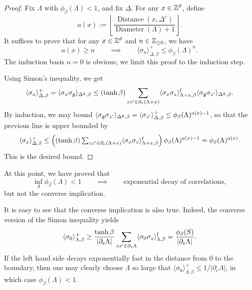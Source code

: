 \begin{proof}
    Fix $\Lambda$ with $\phi_\beta(\Lambda)<1$,
    and fix $\Delta$.
    For any $x\in\mathbb Z^d$, define
    \[
        a(x):=\left\lfloor
        \frac{
            \operatorname{Distance}(x,\Delta^c)
        }{
            \operatorname{Diameter}(\Lambda)+1
        }
    \right\rfloor.
    \]
    It suffices to prove that for any $x\in\mathbb Z^d$ and $n\in\mathbb Z_{\geq 0}$, we have
    \[
        a(x)\geq n
        \qquad\implies\qquad
        \langle\sigma_x\rangle_{\Delta,\beta}^+ \leq \phi_\beta(\Lambda)^n.
    \]
    The induction basis $n=0$ is obvious; we limit this proof to the induction step.

    Using Simon's inequality, we get
    \[
        \langle\sigma_x\rangle_{\Delta,\beta}^+
        =
        \langle\sigma_x\sigma_\mathfrak g\rangle_{\Delta^\mathfrak g,\beta}
        \leq 
        (\tanh\beta)
            \sum_{zz'\in\partial_e(\Lambda+x)}
            \langle\sigma_x\sigma_z\rangle_{\Lambda+x,\beta}^{\operatorname{f}}
            \langle\sigma_\mathfrak g\sigma_{z'}\rangle_{\Delta^\mathfrak g,\beta}.
    \]
    By induction, we may bound $\langle\sigma_\mathfrak g\sigma_{z'}\rangle_{\Delta^\mathfrak g,\beta}=\langle\sigma_{z'}\rangle_{\Delta,\beta}^+\leq \phi_\beta(\Lambda)^{a(x)-1}$,
    so that the previous line is upper bounded by
    \[
        \langle\sigma_x\rangle_{\Delta,\beta}^+
        \leq
        \left(\textstyle
        (\tanh\beta)
            \sum_{zz'\in\partial_e(\Lambda+x)}
            \langle\sigma_x\sigma_z\rangle_{\Lambda+x,\beta}^{\operatorname{f}}
            \right)
            \phi_\beta(\Lambda)^{a(x)-1}
            =
            \phi_\beta(\Lambda)^{a(x)}.
    \]
    This is the desired bound.
\end{proof}

\begin{remark}
    At this point, we have proved that
    \[
        \inf_\Lambda \phi_\beta(\Lambda) < 1
        \qquad
        \implies
        \qquad
        \text{exponential decay of correlations},
    \]
    but not the converse implication.

    It is easy to see that the converse implication is also true.
    Indeed, the converse version of the Simon inequality yields
    \[
        \langle \sigma_0\rangle_{\Lambda,\beta}^+
        \geq \frac{\tanh\beta}{|\partial_e\Lambda|} 
        \sum_{zz'\in\partial_e\Lambda}
            \langle\sigma_0\sigma_z\rangle_{\Lambda,\beta}^{\operatorname{f}}
            =\frac{\phi_\beta(S)}{|\partial_e\Lambda|}.
    \]
    If the left hand side decays exponentially fast in the distance from $0$ to the boundary,
    then one may clearly choose $\Lambda$ so large that 
    $\langle \sigma_0\rangle_{\Lambda,\beta}^+\leq 1/|\partial_e\Lambda|$, in which case $\phi_\beta(\Lambda)<1$.
\end{remark}
